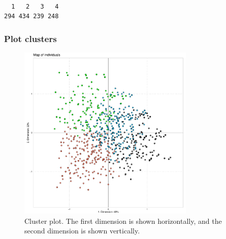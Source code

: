 \documentclass[
  letterpaper,
  DIV=11,
  numbers=noendperiod]{scrartcl}
\newenvironment{Shaded}{\begin{snugshade}}{\end{snugshade}}
\newcommand{\AttributeTok}[1]{\textcolor[rgb]{0.40,0.45,0.13}{#1}}
\newcommand{\FloatTok}[1]{\textcolor[rgb]{0.68,0.00,0.00}{#1}}
\newcommand{\FunctionTok}[1]{\textcolor[rgb]{0.28,0.35,0.67}{#1}}
\newcommand{\NormalTok}[1]{\textcolor[rgb]{0.00,0.23,0.31}{#1}}
\newcommand{\OtherTok}[1]{\textcolor[rgb]{0.00,0.23,0.31}{#1}}
\newcommand{\SpecialCharTok}[1]{\textcolor[rgb]{0.37,0.37,0.37}{#1}}
\newcommand{\StringTok}[1]{\textcolor[rgb]{0.13,0.47,0.30}{#1}}
\begin{document}
\begin{verbatim}

  1   2   3   4 
294 434 239 248 
\end{verbatim}

\normalsize

\subsubsection{Plot clusters}\label{plot-clusters}

\scriptsize

\begin{Shaded}
\end{Shaded}

\begin{figure}[H]

{\centering \includegraphics[width=0.75\textwidth,height=\textheight]{ctrl+R_files/figure-pdf/unnamed-chunk-14-1.pdf}

}

\caption{Cluster plot. The first dimension is shown horizontally, and
the second dimension is shown vertically.}

\end{figure}%
\end{document}
